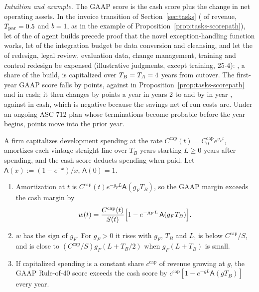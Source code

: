 \noindent\emph{Intuition and example.} The GAAP score is the cash score plus the change in net operating assets. In the invoice transition of Section~\ref{sec:tasks} (\acctExRevenue{} of revenue, $T_{\mathrm{par}}=0.5$ and $b=1$, as in the example of Proposition~\ref{prop:tasks-scorepath}), let \acctExUnc{} of the \acctExBuilds{} of agent builds precede proof that the novel exception-handling function works, let \acctExDC{} of the \acctExIntegration{} integration budget be data conversion and cleansing, and let the \acctExOther{} of redesign, legal review, evaluation data, change management, training and control redesign be expensed (illustrative judgments, except training, 25-4): \acctExFcap{}, a share \acctExFcapShare{} of the build, is capitalized over $T_B=T_A=4$ years from cutover. The first-year GAAP score falls by \acctExGone{} points, against \acctExScorepathG{} in Proposition~\ref{prop:tasks-scorepath} and \acctExCashOne{} in cash; it then changes by \acctExGfull{} points a year in years 2 to \acctExFullEnd{} and by \acctExGpartial{} in year \acctExPartialYear, against \acctExCashLater{} in cash, which is negative because the savings net of run costs are. Under an ongoing ASC 712 plan whose terminations become probable before the year begins, \acctExSevShift{} points move into the prior year.

\begin{proposition}\label{prop:acct-program}
A firm capitalizes development spending at the rate $C^{\mathrm{cap}}(t)=C^{\mathrm{cap}}_0e^{g_Ft}$, amortizes each vintage straight line over $T_B$ years starting $L\ge 0$ years after spending, and the cash score deducts spending when paid. Let $\mathsf A(x):=(1-e^{-x})/x$, $\mathsf A(0)=1$.
\begin{enumerate}
\item[(a)] Amortization at $t$ is $C^{\mathrm{cap}}(t)e^{-g_FL}\mathsf A(g_FT_B)$, so the GAAP margin exceeds the cash margin by
\begin{equation}\label{eq:acct-wedge}
w(t)=\frac{C^{\mathrm{cap}}(t)}{S(t)}\Bigl[1-e^{-g_FL}\,\mathsf A(g_FT_B)\Bigr].
\end{equation}
\item[(b)] $w$ has the sign of $g_F$. For $g_F>0$ it rises with $g_F$, $T_B$ and $L$, is below $C^{\mathrm{cap}}/S$, and is close to $(C^{\mathrm{cap}}/S)g_F(L+T_B/2)$ when $g_F(L+T_B)$ is small.
\item[(c)] If capitalized spending is a constant share $c^{\mathrm{cap}}$ of revenue growing at $g$, the GAAP Rule-of-40 score exceeds the cash score by $c^{\mathrm{cap}}[1-e^{-gL}\mathsf A(gT_B)]$ every year.
\end{enumerate}
\end{proposition}

